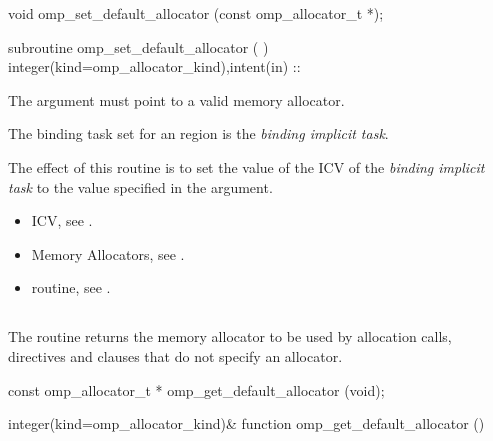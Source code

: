 \format
\begin{ccppspecific}
\begin{ompcFunction}
void omp_set_default_allocator (const omp_allocator_t *);
\end{ompcFunction}
\end{ccppspecific}
\begin{fortranspecific}
\begin{ompfSubroutine}
subroutine omp_set_default_allocator (  )
integer(kind=omp_allocator_kind),intent(in) :: 
\end{ompfSubroutine}
\end{fortranspecific}

\constraints

The  argument must point to a valid memory allocator.

\binding
The binding task set for an  region is the \emph{binding implicit task}.

\effect

The effect of this routine is to set the value of the  ICV of the \emph{binding implicit task} to the value specified in the  argument.

\crossreferences

\begin{itemize}
\item {} ICV, see .
\item Memory Allocators, see .
\item {} routine, see .
\end{itemize}

\subsection{}
\label{subsec:omp_get_default_allocator}

\summary
The  routine returns the memory allocator to be used by allocation calls,  directives and  clauses that do not specify an allocator.

\format
\begin{ccppspecific}
\begin{ompcFunction}
const omp_allocator_t * omp_get_default_allocator (void);
\end{ompcFunction}
\end{ccppspecific}
\begin{fortranspecific}
\begin{ompfFunction}
integer(kind=omp_allocator_kind)&
function omp_get_default_allocator ()
\end{ompfFunction}
\end{fortranspecific}

